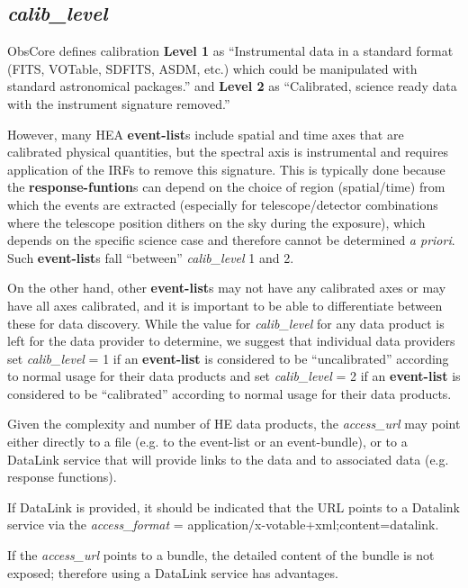 \documentclass[11pt,a4paper]{ivoa}
\begin{document}

\subsection{{\em calib\_level}}

ObsCore defines calibration {\bf Level 1} as ``Instrumental data in a standard format (FITS, VOTable, SDFITS, ASDM, etc.) which could be manipulated with standard astronomical packages.'' and {\bf Level 2} as ``Calibrated, science ready data with the instrument signature removed.''

However, many HEA {\bf event-list}s include spatial and time axes that are calibrated physical quantities, but the spectral axis is instrumental and requires application of the IRFs to remove this signature.  This is typically done because the {\bf response-funtion}s can depend on the choice of region (spatial/time) from which the events are extracted (especially for telescope/detector combinations where the telescope position dithers on the sky during the exposure), which depends on the specific science case and therefore cannot be determined {\em a priori\/}.  Such {\bf event-list}s fall ``between'' {\em calib\_level\/} 1 and 2.

On the other hand, other {\bf event-list}s may not have any calibrated axes or may have all axes calibrated, and it is important to be able to differentiate between these for data discovery.  While the value for {\em calib\_level\/} for any data product is left for the data provider to determine, we suggest that individual data providers set {\em calib\_level\/} = 1 if an {\bf event-list} is considered to be ``uncalibrated'' according to normal usage for their data products and set {\em calib\_level\/} = 2 if an {\bf event-list} is considered to be ``calibrated'' according to normal usage for their data products.

Given the complexity and number of HE data products, the {\em access\_url} may point either directly to a file (e.g. to the event-list or an event-bundle), or to a DataLink service that will provide links to the data and to associated data (e.g. response functions).

If DataLink is provided, it should be indicated that the URL points to a Datalink service via the {\em access\_format} = application/x-votable+xml;content=datalink.

If the {\em access\_url} points to a bundle, the detailed content of the bundle is not exposed; therefore using a DataLink service has advantages.
\end{document}
